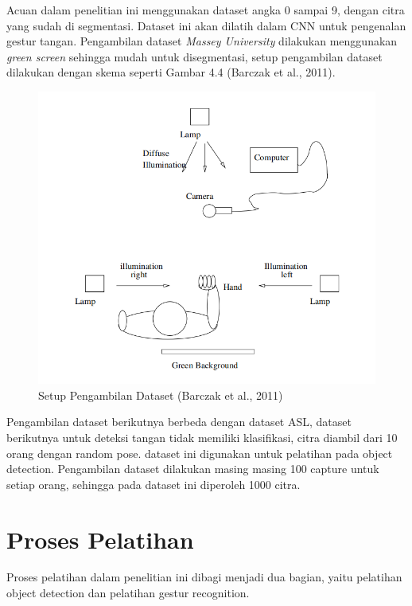 Acuan dalam penelitian ini menggunakan dataset angka 0 sampai 9, dengan citra yang sudah di segmentasi.
Dataset ini akan dilatih dalam CNN untuk pengenalan gestur tangan.
Pengambilan dataset \emph{Massey University} dilakukan menggunakan \emph{green screen} sehingga mudah untuk disegmentasi, setup pengambilan dataset dilakukan dengan skema seperti Gambar 4.4 (Barczak et al., 2011).
\begin{figure}[H]
	\centering
	\includegraphics[width=0.8\linewidth]{setup}
	\caption{Setup Pengambilan Dataset (Barczak et al., 2011)}
	\label{fig:setup}
\end{figure}

Pengambilan dataset berikutnya berbeda dengan dataset ASL, dataset berikutnya untuk deteksi tangan tidak memiliki klasifikasi, citra diambil dari 10 orang dengan random pose. 
dataset ini digunakan untuk pelatihan pada object detection. Pengambilan dataset dilakukan masing masing 100 capture untuk setiap orang, 
sehingga pada dataset ini diperoleh 1000 citra.
\section{Proses Pelatihan}
Proses pelatihan dalam penelitian ini dibagi menjadi dua bagian, yaitu pelatihan object detection dan pelatihan gestur recognition.
